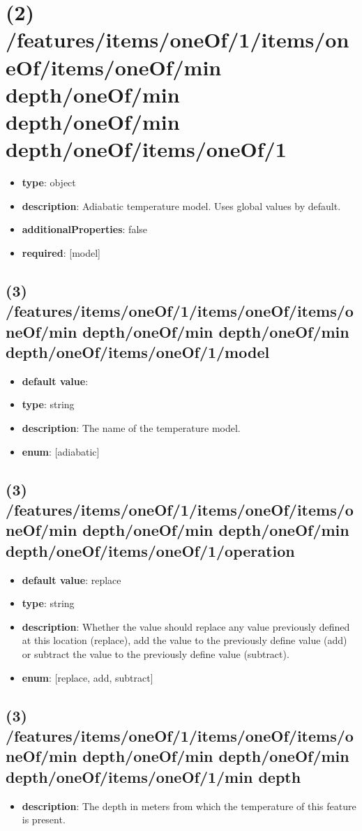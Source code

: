 \section{(2) /features/items/oneOf/1/items/oneOf/items/oneOf/min depth/oneOf/min depth/oneOf/min depth/oneOf/items/oneOf/1}
\begin{itemize}[leftmargin=2em]\item {\bf type}: object
\item {\bf description}: Adiabatic temperature model. Uses global values by default.
\item {\bf additionalProperties}: false
\item {\bf required}: [model]\end{itemize}
\subsection{(3) /features/items/oneOf/1/items/oneOf/items/oneOf/min depth/oneOf/min depth/oneOf/min depth/oneOf/items/oneOf/1/model}
\begin{itemize}[leftmargin=3em]\item {\bf default value}: 
\item {\bf type}: string
\item {\bf description}: The name of the temperature model.
\item {\bf enum}: [adiabatic]\end{itemize}\subsection{(3) /features/items/oneOf/1/items/oneOf/items/oneOf/min depth/oneOf/min depth/oneOf/min depth/oneOf/items/oneOf/1/operation}
\begin{itemize}[leftmargin=3em]\item {\bf default value}: replace
\item {\bf type}: string
\item {\bf description}: Whether the value should replace any value previously defined at this location (replace), add the value to the previously define value (add) or subtract the value to the previously define value (subtract).
\item {\bf enum}: [replace, add, subtract]\end{itemize}\subsection{(3) /features/items/oneOf/1/items/oneOf/items/oneOf/min depth/oneOf/min depth/oneOf/min depth/oneOf/items/oneOf/1/min depth}
\begin{itemize}[leftmargin=3em]\item {\bf description}: The depth in meters from which the temperature of this feature is present.
\end{itemize}
